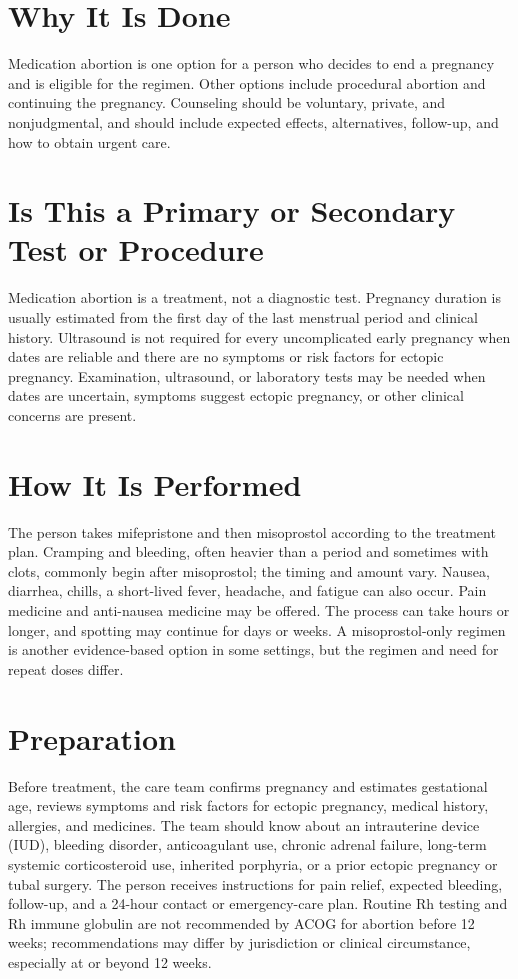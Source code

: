 \section*{Why It Is Done}
Medication abortion is one option for a person who decides to end a pregnancy and is eligible for the regimen. Other options include procedural abortion and continuing the pregnancy. Counseling should be voluntary, private, and nonjudgmental, and should include expected effects, alternatives, follow-up, and how to obtain urgent care.

\section*{Is This a Primary or Secondary Test or Procedure}
Medication abortion is a treatment, not a diagnostic test. Pregnancy duration is usually estimated from the first day of the last menstrual period and clinical history. Ultrasound is not required for every uncomplicated early pregnancy when dates are reliable and there are no symptoms or risk factors for ectopic pregnancy. Examination, ultrasound, or laboratory tests may be needed when dates are uncertain, symptoms suggest ectopic pregnancy, or other clinical concerns are present.

\section*{How It Is Performed}
The person takes mifepristone and then misoprostol according to the treatment plan. Cramping and bleeding, often heavier than a period and sometimes with clots, commonly begin after misoprostol; the timing and amount vary. Nausea, diarrhea, chills, a short-lived fever, headache, and fatigue can also occur. Pain medicine and anti-nausea medicine may be offered. The process can take hours or longer, and spotting may continue for days or weeks. A misoprostol-only regimen is another evidence-based option in some settings, but the regimen and need for repeat doses differ.

\section*{Preparation}
Before treatment, the care team confirms pregnancy and estimates gestational age, reviews symptoms and risk factors for ectopic pregnancy, medical history, allergies, and medicines. The team should know about an intrauterine device (IUD), bleeding disorder, anticoagulant use, chronic adrenal failure, long-term systemic corticosteroid use, inherited porphyria, or a prior ectopic pregnancy or tubal surgery. The person receives instructions for pain relief, expected bleeding, follow-up, and a 24-hour contact or emergency-care plan. Routine Rh testing and Rh immune globulin are not recommended by ACOG for abortion before 12 weeks; recommendations may differ by jurisdiction or clinical circumstance, especially at or beyond 12 weeks.

